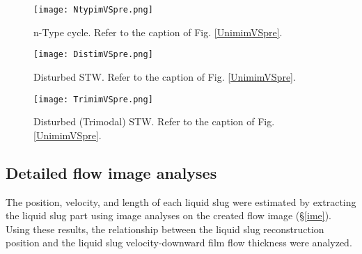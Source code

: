 \documentclass[aps,pre,preprint,groupedaddress,showkeys]{revtex4-2}
\begin{document}
\begin{figure}
\texttt{[image: NtypimVSpre.png]} 
\caption{\label{NtypimVSpre}n-Type cycle. Refer to the caption of Fig. \ref{UnimimVSpre}.}
\end{figure} 

\begin{figure}
\texttt{[image: DistimVSpre.png]} 
\caption{\label{DistimVSpre}Disturbed STW. Refer to the caption of Fig. \ref{UnimimVSpre}.}
\end{figure}

\begin{figure}
\texttt{[image: TrimimVSpre.png]} 
\caption{\label{TrimimVSpre}Disturbed (Trimodal) STW. Refer to the caption of Fig. \ref{UnimimVSpre}.}
\end{figure} 

\subsection{Detailed flow image analyses}
The position, velocity, and length of each liquid slug were estimated by extracting the liquid slug part using image analyses on the created flow image (\S \ref{ime}).
Using these results, the relationship between the liquid slug reconstruction position and the liquid slug velocity-downward film flow thickness were analyzed.
\end{document}
